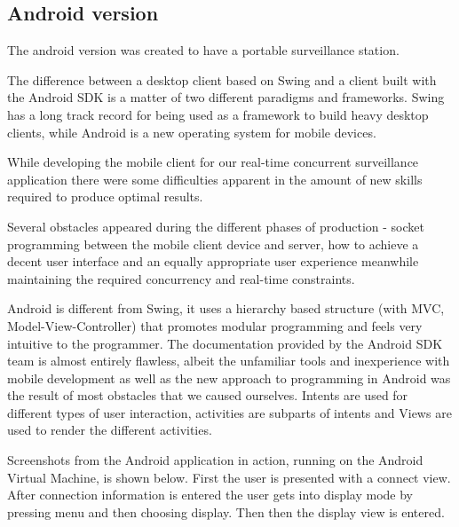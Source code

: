 \documentclass[8pt,titlepage]{article}
\begin{document}
\clearpage

\subsection{Android version}
The android version was created to have a portable surveillance station.

The difference between a desktop client based on Swing and a client built with the Android SDK is a matter of two different paradigms and frameworks. Swing has a long track record for being used as a framework to build heavy desktop clients, while Android is a new operating system for mobile devices. 

While developing the mobile client for our real-time concurrent surveillance application there were some difficulties apparent in the amount of new skills required to produce optimal results. 

Several obstacles appeared during the different phases of production - socket programming between the mobile client device and server, how to achieve a decent user interface and an equally appropriate user experience meanwhile maintaining the required concurrency and real-time constraints. 

Android is different from Swing, it uses a hierarchy based structure (with MVC, Model-View-Controller) that promotes modular programming and feels very intuitive to the programmer. The documentation provided by the Android SDK team is almost entirely flawless, albeit the unfamiliar tools and inexperience with mobile development as well as the new approach to programming in Android was the result of most obstacles that we caused ourselves.
Intents are used for different types of user interaction, activities are subparts of intents and Views are used to render the different activities. 

Screenshots from the Android application in action, running on the Android Virtual Machine, is shown below. First the user is presented with a connect view. After connection information is entered the user gets into display mode by pressing menu and then choosing display. Then then the display view is entered.
\end{document}

